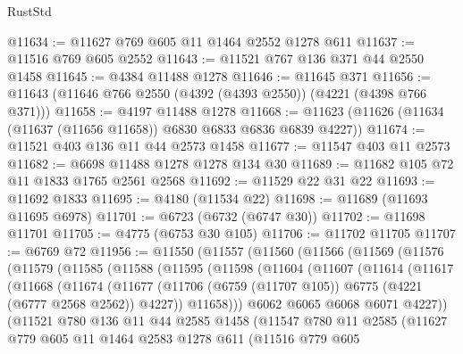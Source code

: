 \begin{lexlean}{RustStd}
\begin{coremodule}
{\begin{coremodule}
{{{{{{{{{{{{{{{{{{{{{{{{{{{{{{{@11634 := @11627 @769 @605 @11 @1464 @2552 @1278 @611
@11637 := @11516 @769 @605 @2552
@11643 := @11521 @767 @136 @371 @44 @2550 @1458
@11645 := @4384 @11488 @1278
@11646 := @11645 @371
@11656 := @11643 (@11646 @766 @2550 (@4392 (@4393 @2550)) (@4221 (@4398 @766 @371)))
@11658 := @4197 @11488 @1278
@11668 := @11623 (@11626 (@11634 (@11637 (@11656 @11658)) @6830 @6833 @6836 @6839 @4227))
@11674 := @11521 @403 @136 @11 @44 @2573 @1458
@11677 := @11547 @403 @11 @2573
@11682 := @6698 @11488 @1278 @1278 @134 @30
@11689 := @11682 @105 @72 @11 @1833 @1765 @2561 @2568
@11692 := @11529 @22 @31 @22
@11693 := @11692 @1833
@11695 := @4180 (@11534 @22)
@11698 := @11689 (@11693 @11695 @6978)
@11701 := @6723 (@6732 (@6747 @30))
@11702 := @11698 @11701
@11705 := @4775 (@6753 @30 @105)
@11706 := @11702 @11705
@11707 := @6769 @72
@11956 := @11550
    (@11557
      (@11560
        (@11566
          (@11569
            (@11576
              (@11579
                (@11585
                  (@11588
                    (@11595
                      (@11598
                        (@11604
                          (@11607
                            (@11614
                              (@11617
                                (@11668
                                  (@11674
                                    (@11677
                                      (@11706
                                        (@6759 (@11707 @105))
                                        @6775
                                        (@4221 (@6777 @2568 @2562))
                                        @4227))
                                    @11658)))
                              @6062
                              @6065
                              @6068
                              @6071
                              @4227))
                          (@11521
                            @780
                            @136
                            @11
                            @44
                            @2585
                            @1458
                            (@11547
                              @780
                              @11
                              @2585
                              (@11627
                                @779
                                @605
                                @11
                                @1464
                                @2583
                                @1278
                                @611
                                (@11516
                                  @779
                                  @605
}}}}}}}}}}}}}}}}}}}}}}}}}}}}}}}
\end{coremodule}}
\end{coremodule}
\end{lexlean}
